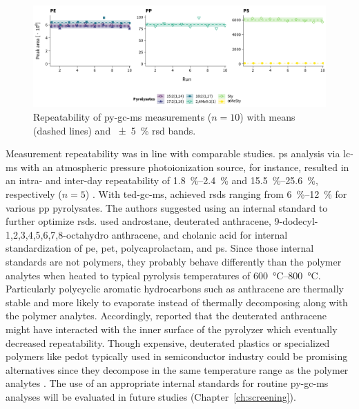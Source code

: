 \begin{figure}[t]
	\centering
	\includegraphics[width=\textwidth]{figures/py-repeatability}
	\caption[Repeatability of \ac{py-gc-ms} measurements.]{Repeatability of \ac{py-gc-ms} measurements ($n = 10$) with means (dashed lines) and \SI{+-5}{\percent} \acs{rsd} bands.}
	\label{fig:py-repeatability}
\end{figure}

Measurement repeatability was in line with comparable studies. \Ac{ps} analysis via \ac{lc-ms} with an atmospheric pressure photoionization source, for instance, resulted in an intra- and inter-day repeatability of \SIrange{1.8}{2.4}{\percent} and \SIrange{15.5}{25.6}{\percent}, respectively ($n = 5$) \citep{SchirinziTrace2019}. With \ac{ted-gc-ms}, \citet{DuemichenAutomated2019} achieved \acp{rsd} ranging from \SIrange[range-phrase = { to }]{6}{12}{\percent} for various \ac{pp} pyrolysates. The authors suggested using an internal standard to further optimize \acp{rsd}. \citet{FischerMicroplastics2019} used androstane, deuterated anthracene, 9-dodecyl-1,2,3,4,5,6,7,8-octahydro anthracene, and cholanic acid for internal standardization of \ac{pe}, \ac{pet}, polycaprolactam, and \ac{ps}. Since those internal standards are not polymers, they probably behave differently than the polymer analytes when heated to typical pyrolysis temperatures of \SIrange{600}{800}{\degreeCelsius}. Particularly polycyclic aromatic hydrocarbons such as anthracene are thermally stable and more likely to evaporate instead of thermally decomposing along with the polymer analytes. Accordingly, \citet{FischerMicroplastics2019} reported that the deuterated anthracene might have interacted with the inner surface of the pyrolyzer which eventually decreased repeatability. Though expensive, deuterated plastics \citep{DierkesQuantification2019} or specialized polymers like \ac{pedot} typically used in semiconductor industry could be promising alternatives since they decompose in the same temperature range as the polymer analytes \citep{JinThermal2013}. The use of an appropriate internal standards for routine \ac{py-gc-ms} analyses will be evaluated in future studies (Chapter~\ref{ch:screening}).

